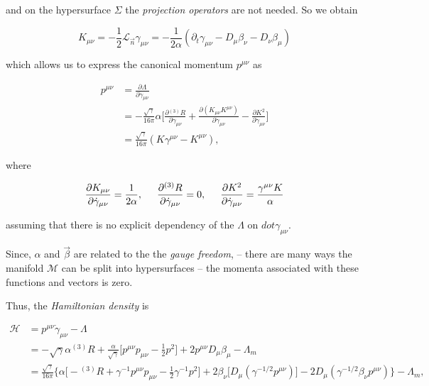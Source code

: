 {    and on the hypersurface $\Sigma$ the \textit{projection operators} are not needed. So we obtain
    
    \begin{equation}
        K_{\mu\nu} = -\frac{1}{2}\mathcal{L}_{\vec{n}}\gamma_{\mu\nu}=-\frac{1}{2\alpha}(\partial_t\gamma_{\mu\nu}-D_{\mu}\beta_{\nu}-D_{\nu}\beta_{\mu})
    \end{equation}
    
    which allows us to express the canonical momentum $p^{\mu\nu}$ as
    
    \begin{align}
        p^{\mu\nu} &= \frac{\partial\Lambda}{\partial\dot{\gamma}_{\mu\nu}} \\
        &= -\frac{\sqrt{\gamma}}{16\pi}\alpha\Bigg[\frac{\partial {^{(3)}R}}{\partial\dot{\gamma}_{\mu\nu}} + \frac{\partial(K_{\mu\nu}K^{\mu\nu})}{\partial\dot{\gamma}_{\mu\nu}} - \frac{\partial K^2}{\partial\dot{\gamma}_{\mu\nu}}\Bigg] \\
        &= \frac{\sqrt{\gamma}}{16\pi}(K\gamma^{\mu\nu} - K^{\mu\nu}),
    \end{align}
    
    where 
    
    \begin{equation}
        \frac{\partial K_{\mu\nu}}{\partial \dot{\gamma}_{\mu\nu}} = \frac{1}{2\alpha}, \hspace{5mm} \frac{\partial {^{(3)}R}}{\partial \dot{\gamma}_{\mu\nu}} = 0, \hspace{5mm}\frac{\partial K^2}{\partial \dot{\gamma}_{\mu\nu}} = \frac{\gamma^{\mu\nu}K}{\alpha}
    \end{equation}
    
    assuming that there is no explicit dependency of the $\Lambda$ on $dot{\gamma}_{\mu\nu}$.
    
    Since, $\alpha$ and $\vec{\beta}$ are related to the the \textit{gauge freedom}, -- there are many ways the manifold $\mathcal{M}$ can be split into hypersurfaces -- the momenta associated with these functions and vectors is zero.
    
    Thus, the \textit{Hamiltonian density} is
    
    \begin{align}
        \mathcal{H} &= p^{\mu\nu}\dot{\gamma}_{\mu\nu} - \Lambda \\
        &= -\sqrt{\gamma}\alpha{^{(3)}R} + \frac{\alpha}{\sqrt{\gamma}}\Big[p^{\mu\nu}p_{\mu\nu}-\frac{1}{2}p^2\Big] + 2p^{\mu\nu} D_{\mu}\beta_{\mu} -\Lambda_m \\
        &= \frac{\sqrt{\gamma}}{16\pi}\Bigg\{\alpha\Big[ -{^{(3)}R} + \gamma^{-1}p^{\mu\nu}p_{\mu\nu}-\frac{1}{2}\gamma^{-1}p^2\Big] +  2\beta_{\nu}\Big[D_{\mu}(\gamma^{-1/2}p^{\mu\nu})\Big] - 2D_{\mu}(\gamma^{-1/2}\beta_{\nu}p^{\mu\nu}) \Bigg\} - \Lambda_m,
    \end{align}
    
}
